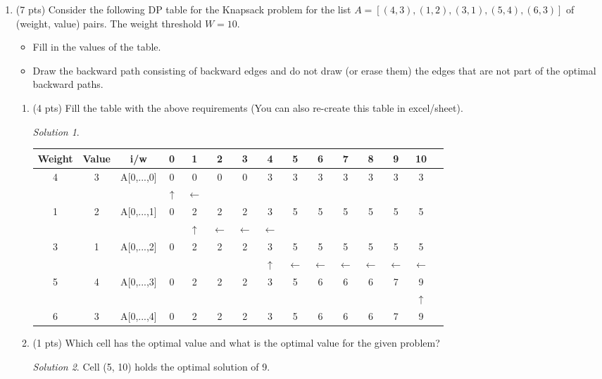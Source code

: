 \documentclass[12pt]{article}
\theoremstyle{remark}
\newtheorem*{solution}{Solution}
\begin{document}
\begin{enumerate}

\item (7 pts) Consider the following DP table for the Knapsack problem for the list $A = [(4, 3), (1, 2), (3, 1), (5, 4), (6, 3)] $ of (weight, value) pairs. The weight threshold $W = 10$.
\begin{itemize}
    \item Fill in the values of the table.
    \item Draw the backward path consisting of backward edges and do not draw (or erase them) the edges that are not part of the optimal backward paths.
\end{itemize}

\begin{enumerate}
    \item (4 pts) Fill the table with the above requirements (You can also re-create this table in excel/sheet).
    \begin{solution}

    \end{solution}

\begin{center}
\begin{tabular}{ |c|c|c|c|c|c|c|c|c|c|c|c|c|c|c| } 
 \hline
Weight & Value & i/w & 0 & 1 & 2 & 3 & 4 & 5 & 6 & 7 & 8 & 9 & 10 \\
\hline
4 & 3 & A[0,...,0] & 0 & 0 & 0 & 0 & 3 & 3 & 3 & 3 & 3 & 3 & 3 \\
 \hline
 &  &  & $\uparrow$ & $\leftarrow$ &  &  &  &  &  &  &  &  &  \\
 \hline
1 & 2 & A[0,...,1] & 0 & 2 & 2 & 2 & 3 & 5 & 5 & 5 & 5 & 5 & 5 \\
 \hline
 &  &  &  & $\uparrow$  & $\leftarrow$  & $\leftarrow$  & $\leftarrow$ &  &  &   &  &  &  \\
 \hline
3 & 1 & A[0,...,2] & 0 & 2 & 2 & 2 & 3 & 5 & 5 & 5 & 5 & 5 & 5 \\
 \hline
 &  &  &  &  &  &  & $\uparrow$ & $\leftarrow$ & $\leftarrow$ & $\leftarrow$  & $\leftarrow$ & $\leftarrow$ & $\leftarrow$ \\
 \hline
5 & 4 & A[0,...,3] & 0 & 2 & 2 & 2 & 3 & 5 & 6 & 6 & 6 & 7 & 9 \\
 \hline
 &  &  &  &  &  &  &  &  &  &  &  &  & $\uparrow$ \\
 \hline
6 & 3 & A[0,...,4] & 0 & 2 & 2 & 2 & 3 & 5 & 6 & 6 & 6 & 7 & 9 \\
 \hline
\end{tabular}
\end{center}
    \item (1 pts) Which cell has the optimal value and what is the optimal value for the given problem?
    \begin{solution}
Cell (5, 10) holds the optimal solution of 9.
    \end{solution}
    

\end{enumerate}
\end{enumerate}
\end{document}
